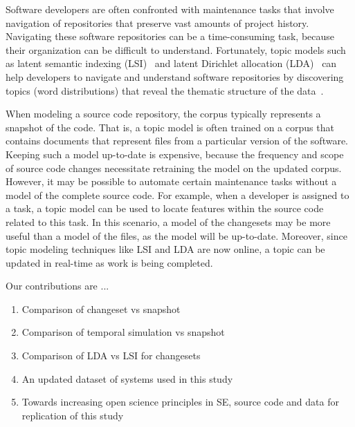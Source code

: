 %

Software developers are often confronted with maintenance tasks that involve navigation of repositories that preserve vast amounts of project history.
 Navigating these software repositories can be a time-consuming task, because their organization can be difficult to understand.
 Fortunately, topic models such as latent semantic indexing (LSI)~\cite{Deerwester:1990} and latent Dirichlet allocation (LDA)~\cite{Blei-etal:2003} can help developers to navigate and understand software repositories by discovering topics (word distributions) that reveal the thematic structure of the data~\cite{Linstead-etal:2007,Thomas-etal:2011,Hindle_etal:2012}.

When modeling a source code repository, the corpus typically represents a snapshot of the code.
That is, a topic model is often trained on a corpus that contains documents that represent files from a particular version of the software.
Keeping such a model up-to-date is expensive, because the frequency and scope of source code changes necessitate retraining the model on the updated corpus.
However, it may be possible to automate certain maintenance tasks without a model of the complete source code.
For example, when a developer is assigned to a task, a topic model can be used
to locate features within the source code related to this task.
In this scenario, a model of the changesets may be more useful than a model of the files,
as the model will be up-to-date.
Moreover, since topic modeling techniques like LSI and LDA are now online,
a topic can be updated in real-time as work is being completed.

Our contributions are ...

\begin{enumerate}
    \item Comparison of changeset vs snapshot
    \item Comparison of temporal simulation vs snapshot
    \item Comparison of LDA vs LSI for changesets
    \item An updated dataset of systems used in this study
    \item Towards increasing open science principles in SE,
        source code and data for replication of this study
\end{enumerate}

